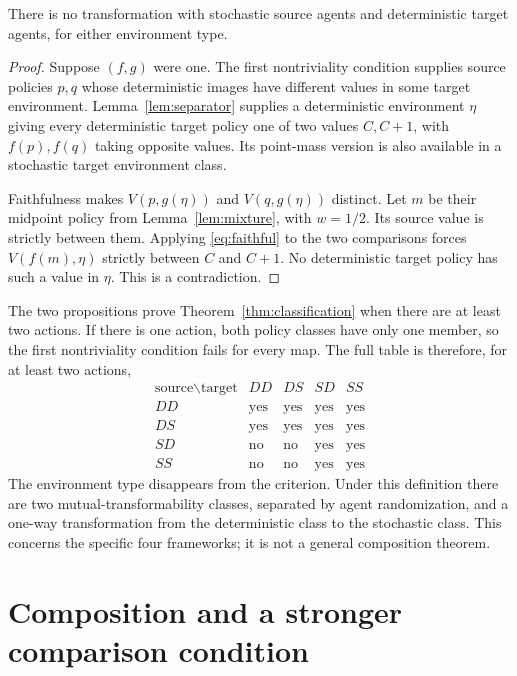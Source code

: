 \documentclass[11pt]{article}
\begin{document}
\begin{proposition}\label{prop:negative}
There is no transformation with stochastic source agents and
deterministic target agents, for either environment type.
\end{proposition}
\begin{proof}
Suppose $(f,g)$ were one. The first nontriviality condition supplies
source policies $p,q$ whose deterministic images have different values
in some target environment. Lemma~\ref{lem:separator} supplies a
deterministic environment $\eta$ giving every deterministic target
policy one of two values $C,C+1$, with $f(p),f(q)$ taking opposite
values. Its point-mass version is also available in a stochastic
target environment class.

Faithfulness makes $V(p,g(\eta))$ and $V(q,g(\eta))$ distinct.
Let $m$ be their midpoint policy from Lemma~\ref{lem:mixture}, with
$w=1/2$. Its source value is strictly between them. Applying
\eqref{eq:faithful} to the two comparisons forces $V(f(m),\eta)$
strictly between $C$ and $C+1$. No deterministic target policy has
such a value in $\eta$. This is a contradiction.
\end{proof}

The two propositions prove Theorem~\ref{thm:classification} when there
are at least two actions. If there is one action, both policy classes
have only one member, so the first nontriviality condition fails for
every map. The full table is therefore, for at least two actions,
\[
\begin{array}{c|cccc}
 \text{source}\backslash\text{target}&DD&DS&SD&SS\\\hline
 DD&\text{yes}&\text{yes}&\text{yes}&\text{yes}\\
 DS&\text{yes}&\text{yes}&\text{yes}&\text{yes}\\
 SD&\text{no}&\text{no}&\text{yes}&\text{yes}\\
 SS&\text{no}&\text{no}&\text{yes}&\text{yes}
\end{array}
\]
The environment type disappears from the criterion. Under this
definition there are two mutual-transformability classes, separated
by agent randomization, and a one-way transformation from the
deterministic class to the stochastic class. This concerns the
specific four frameworks; it is not a general composition theorem.

\section{Composition and a stronger comparison condition}
\end{document}
